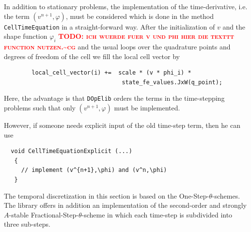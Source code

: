\documentclass[prodmode,acmtoms]{acmsmall}
\numberwithin{equation}{section}
\renewcommand{\phi}{\varphi}
\newcommand{\dope}{\texttt{DOpElib}}
\newcommand{\todocg}[1]{\textbf{\textsc{\textcolor{red}{TODO: #1\textasciitilde cg}}}}
\begin{document}
In addition to stationary problems, the implementation
of the time-derivative, i.e. the term $ (v^{n+1},\phi)$, must be considered which is done
in the method \texttt{CellTimeEquation} in a straight-forward way. After the initialization of $v$ and the shape function $\phi_i$ \todocg{ich wuerde fuer v und phi hier die texttt function nutzen.} and the usual loops over the quadrature points and  degrees of freedom of the cell we fill the local cell vector by
\begin{lstlisting}
        local_cell_vector(i) +=  scale * (v * phi_i) * 
                                  state_fe_values.JxW(q_point);    
\end{lstlisting}
Here, the advantage is that \dope{} orders the terms in the time-stepping
problems
such that only $(v^{n+1},\phi)$ must be implemented. 



\begin{remark}
However, if someone 
needs explicit input of the old time-step term, then he can use 
\begin{lstlisting}
  void CellTimeEquationExplicit (...)
   {
     // implement (v^{n+1},\phi) and (v^n,\phi)  
   }
\end{lstlisting}
\end{remark}

\begin{remark}
The temporal discretization in this section 
is based on the One-Step-$\theta$-schemes. The library
offers in addition an implementation 
of the second-order and strongly $A$-stable 
Fractional-Step-$\theta$-scheme in which 
each time-step is subdivided into three 
sub-steps. 
\end{remark}
\end{document}

